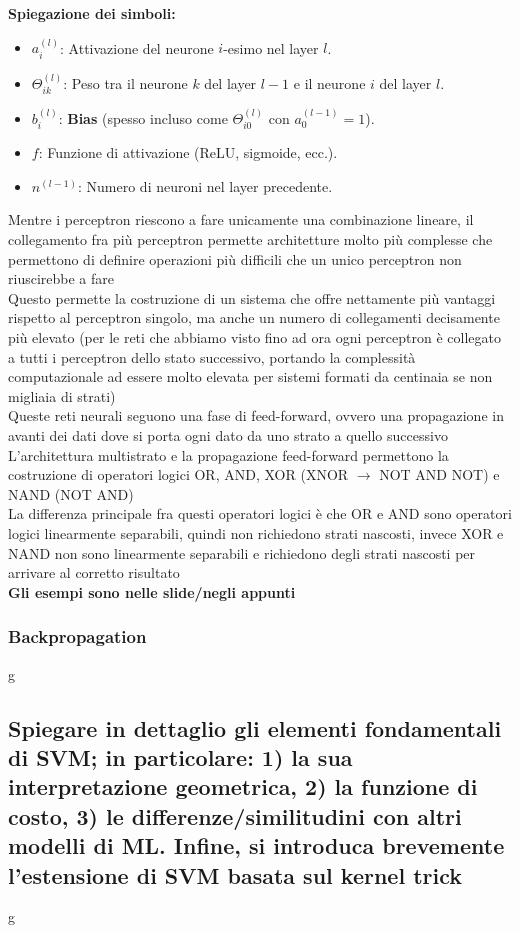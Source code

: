 \documentclass[10pt,oneside,a4paper]{article}
\begin{document}
	\textbf{Spiegazione dei simboli:}
	\begin{itemize}
		\item $a_i^{(l)}$: Attivazione del neurone $i$-esimo nel layer $l$.
		\item $\Theta_{ik}^{(l)}$: Peso tra il neurone $k$ del layer $l-1$ e il neurone $i$ del layer $l$.
		\item $b_i^{(l)}$: \textbf{Bias} (spesso incluso come $\Theta_{i0}^{(l)}$ con $a_0^{(l-1)} = 1$).
		\item $f$: Funzione di attivazione (ReLU, sigmoide, ecc.).
		\item $n^{(l-1)}$: Numero di neuroni nel layer precedente.
	\end{itemize}
	Mentre i perceptron riescono a fare unicamente una combinazione lineare, il collegamento fra più perceptron permette architetture molto più complesse che permettono di definire operazioni più difficili che un unico perceptron non riuscirebbe a fare\\
	Questo permette la costruzione di un sistema che offre nettamente più vantaggi rispetto al perceptron singolo, ma anche un numero di collegamenti decisamente più elevato (per le reti che abbiamo visto fino ad ora ogni perceptron è collegato a tutti i perceptron dello stato successivo, portando la complessità computazionale ad essere molto elevata per sistemi formati da centinaia se non migliaia di strati)\\
	Queste reti neurali seguono una fase di feed-forward, ovvero una propagazione in avanti dei dati dove si porta ogni dato da uno strato a quello successivo\\
	L'architettura multistrato e la propagazione feed-forward permettono la costruzione di operatori logici OR, AND, XOR (XNOR $\to$ NOT AND NOT) e NAND (NOT AND)\\
	La differenza principale fra questi operatori logici è che OR e AND sono operatori logici linearmente separabili, quindi non richiedono strati nascosti, invece XOR e NAND non sono linearmente separabili e richiedono degli strati nascosti per arrivare al corretto risultato\\
	\textbf{Gli esempi sono nelle slide/negli appunti}
	\subsubsection{Backpropagation}
	g
	
	\subsection{Spiegare in dettaglio gli elementi fondamentali di SVM; in particolare:
		1) la sua interpretazione geometrica, 2) la funzione di costo, 3) le differenze/similitudini con altri modelli di ML.
		Infine, si introduca brevemente l’estensione di SVM basata sul kernel trick}
	g
	
\end{document}
